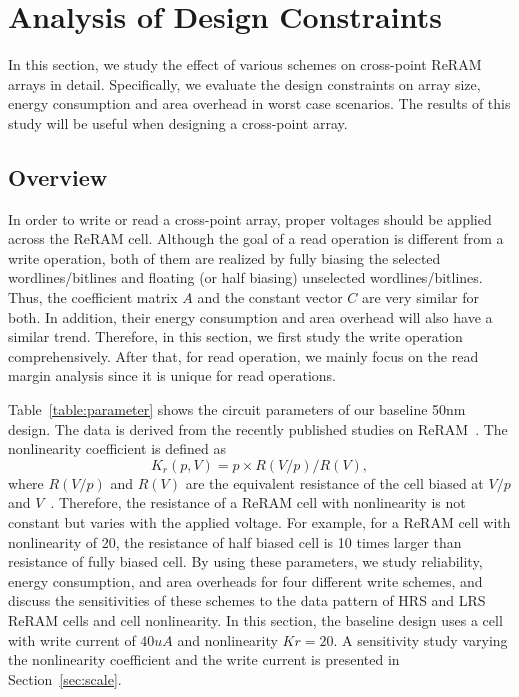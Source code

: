 
\section{Analysis of Design Constraints}\label{sec:w_and_r}

In this section, we study the effect of various schemes on cross-point
ReRAM arrays in detail. Specifically, we evaluate the design constraints
on array size, energy consumption and area overhead in worst case
scenarios. The results of this study will be useful when designing a
cross-point array.

\vspace{-5pt}
\subsection{Overview}
In order to write or read a cross-point array, proper voltages should be
applied across the ReRAM cell. Although the goal of a read operation is
different from a write operation, both of them are realized by fully
biasing the selected wordlines/bitlines and floating (or half biasing)
unselected wordlines/bitlines. Thus, the coefficient matrix $A$ and the
constant vector $C$ are very similar for both. In addition, their energy
consumption and area overhead will also have a similar trend. Therefore,
in this section, we first study the write operation comprehensively. After
that, for read operation, we mainly focus on the read margin analysis
since it is unique for read operations.

Table~\ref{table:parameter} shows the circuit parameters of our baseline
50nm design. The data is derived from the recently published studies on
ReRAM~\cite{ReRAM_overview,memristor:Cong,ReRAM_Renesas}. The nonlinearity
coefficient is defined as
\begin{equation}
K_r(p,V) = p \times R(V/p)/R(V),
\end{equation}
where $R(V/p)$ and $R(V)$ are the equivalent resistance of the cell biased
at $V/p$ and $V$~\cite{memristor:Cong}. Therefore, the resistance of a
ReRAM cell with nonlinearity is not constant but varies with the applied
voltage. For example, for a ReRAM cell with nonlinearity of 20, the
resistance of half biased cell is 10 times larger than resistance of fully
biased cell. By using these parameters, we study reliability, energy
consumption, and area overheads for four different write schemes, and
discuss the sensitivities of these schemes to the data pattern of HRS and
LRS ReRAM cells and cell nonlinearity. In this section, the baseline
design uses a cell with write current of $40 uA$ and nonlinearity $Kr=20$.
A sensitivity study varying the nonlinearity coefficient and the write
current is presented in Section~\ref{sec:scale}.

